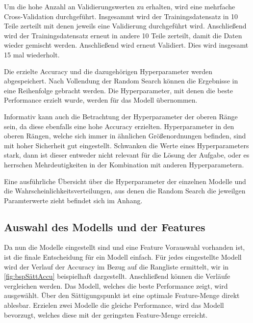 Um die hohe Anzahl an Validierungswerten zu erhalten, wird eine mehrfache Cross-Validation durchgeführt. Insgesammt wird der Trainingsdatensatz in 10 Teile zerteilt mit denen jeweils eine Validierung durchgeführt wird. Anschließend wird der Trainingsdatensatz erneut in andere 10 Teile zerteilt, damit die Daten wieder gemischt werden. Anschließend wird erneut Validiert. Dies wird insgesamt 15 mal wiederholt. \par

Die erzielte Accuracy und die dazugehörigen Hyperparameter werden abgespeichert. Nach Vollendung der Random Search können die Ergebnisse in eine Reihenfolge gebracht werden. Die Hyperparameter, mit denen die beste Performance erzielt wurde, werden für das Modell übernommen. \par

Informativ kann auch die Betrachtung der Hyperparameter der oberen Ränge sein, da diese ebenfalls eine hohe Accuracy erzielten. Hyperparameter in den oberen Rängen, welche sich immer in ähnlichen Größenordnungen befinden, sind mit hoher Sicherheit gut eingestellt. Schwanken die Werte eines Hyperparameters stark, dann ist dieser entweder nicht relevant für die Lösung der Aufgabe, oder es herrschen Mehrdeutigkeiten in der Kombination mit anderen Hyperparametern. \par

Eine ausführliche Übersicht über die Hyperparameter der einzelnen Modelle und die Wahrscheinlichkeitsverteilungen, aus denen die Random Search die jeweilgen Paramterwerte zieht befindet sich im Anhang. 



\subsection{Auswahl des Modells und der Features}\label{sec:Meth ModelSele}
Da nun die Modelle eingestellt sind und eine Feature Vorauswahl vorhanden ist, ist die finale Entscheidung für ein Modell einfach. Für jedes eingestellte Modell wird der Verlauf der Accuracy im Bezug auf die Rangliste ermittelt, wir in \ref{fig:bspSättAccu} beispielhaft dargestellt. Anschließend können die Verläufe vergleichen werden. Das Modell, welches die beste Performance zeigt, wird ausgewählt. Über den Sättigungspunkt ist eine optimale Feature-Menge direkt ablesbar. Erzielen zwei Modelle die gleiche Performance, wird das Modell bevorzugt, welches diese mit der geringsten Feature-Menge erreicht. \par

